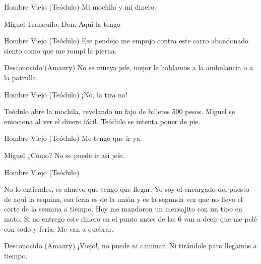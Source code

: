 \begin{dialogue}{Hombre Viejo (Teódulo)}
 Mi mochila y mi dinero.
\end{dialogue}

\begin{dialogue}{Miguel}
Tranquilo, Don. Aquí la tengo
\end{dialogue}

\begin{dialogue}{Hombre Viejo (Teódulo)}
Ese pendejo me empujo contra este carro abandonado siento como que me rompí la pierna.
\end{dialogue}

\begin{dialogue}{Desconocido (Amaury)}
No se mueva jefe, mejor le hablamos a la ambulancia o a la patrulla.
\end{dialogue}

\begin{dialogue}{Hombre Viejo (Teódulo)}
¡No, la tira  no!
\end{dialogue}

\begin{scenedesc}
Teódulo abre la mochila, revelando un fajo de billetes 500 pesos. Miguel se emociona al ver el dinero fácil. Teódulo se intenta poner de pie.
\end{scenedesc}

\begin{dialogue}{Hombre Viejo (Teódulo)}
    Me tengo que ir ya.
\end{dialogue}

\begin{dialogue}{Miguel}
    ¿Cómo? No se puede ir asi jefe.  
\end{dialogue}


\begin{dialogue}{Hombre Viejo (Teódulo)}

    No lo entiendes, es ahuevo que tengo que llegar. Yo soy el encargado del puesto de aqui la esquina, esa feria es de la unión y es la segunda vez que no llevo el corte de la semana a tiempo. Hoy me mandaron un mensajito con un tipo en moto. Si no entrego este dinero en el punto antes de las 6 van a decir que me pelé con todo y feria. Me van a quebrar.

\end{dialogue}


\begin{dialogue}{Desconocido (Amaury)}
¡Viejo!, no puede ni caminar. Ni tirándole paro llegamos a tiempo.
\end{dialogue}

